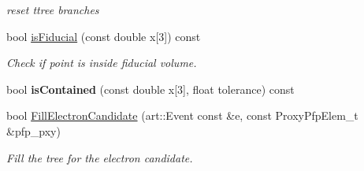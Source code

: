 \begin{DoxyCompactItemize}
\begin{DoxyCompactList}\small\item\em reset ttree branches \end{DoxyCompactList}\item 
bool \hyperlink{classselection_1_1CCincSelection_adf6c627aacf355e0e4c8ff4df5716fee}{is\+Fiducial} (const double x\mbox{[}3\mbox{]}) const 
\begin{DoxyCompactList}\small\item\em Check if point is inside fiducial volume. \end{DoxyCompactList}\item 
bool {\bfseries is\+Contained} (const double x\mbox{[}3\mbox{]}, float tolerance) const \hypertarget{classselection_1_1CCincSelection_a0f7e17ebcdfcb9813b6c3f12bd8eb59d}{}\label{classselection_1_1CCincSelection_a0f7e17ebcdfcb9813b6c3f12bd8eb59d}

\item 
bool \hyperlink{classselection_1_1CCincSelection_a479124737f56d702e4394b83e9d80ccc}{Fill\+Electron\+Candidate} (art\+::\+Event const \&e, const Proxy\+Pfp\+Elem\+\_\+t \&pfp\+\_\+pxy)
\begin{DoxyCompactList}\small\item\em Fill the tree for the electron candidate. \end{DoxyCompactList}\end{DoxyCompactItemize}
